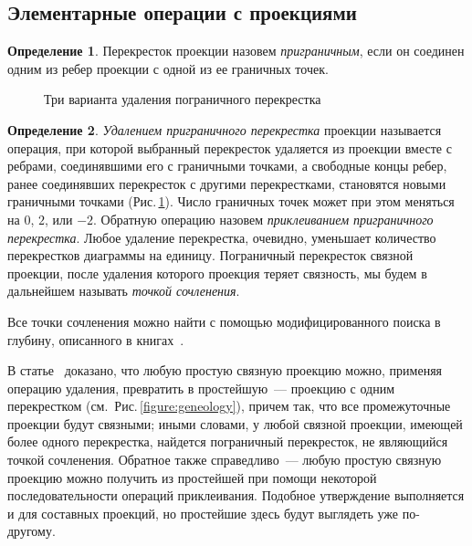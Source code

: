 \documentclass[12pt]{article}
\theoremstyle{plain}
\theoremstyle{definition}
\newtheorem{definition}{Определение}
\def\figureref#1{Рис.\,\protect\ref{#1}}
\begin{document}
	\subsection{Элементарные операции с проекциями}
	\label{subsection:cutting}

		\begin{definition}
			Перекресток проекции назовем \textit{приграничным}, если он соединен одним из ребер проекции с
			одной из ее граничных точек.
		\end{definition}

		\begin{figure}[ht]
			\centering
			\qquad
			\qquad
			\caption{\footnotesize Три варианта удаления пограничного перекрестка\label{figure:tangle-border-deletion}}
		\end{figure}

		\begin{definition}
			\textit{Удалением приграничного перекрестка} проекции называется операция, при которой выбранный
			перекресток удаляется из проекции вместе с ребрами, соединявшими его с граничными точками, а
			свободные концы ребер, ранее соединявших перекресток с другими перекрестками, становятся новыми
			граничными точками (\figureref{figure:tangle-border-deletion}). Число граничных точек может при этом меняться на
			$0$, $2$, или $-2$. Обратную операцию назовем \textit{приклеиванием приграничного перекрестка}. Любое удаление
			перекрестка, очевидно, уменьшает количество перекрестков диаграммы на единицу.
			Пограничный перекресток связной проекции, после удаления которого проекция теряет связность, мы будем в
			дальнейшем называть \textit{точкой сочленения}.
		\end{definition}

		Все точки сочленения можно найти с помощью модифицированного поиска в глубину, описанного в
		книгах~\cite{CormenLeisersonRivestStein2009, Sedgewick1983}.

		В статье~\cite{BogdanovMeshkovOmelchenkoPetrov2011} доказано, что любую простую связную проекцию можно, применяя
		операцию удаления, превратить в простейшую~--- проекцию с одним перекрестком (см.~\figureref{figure:geneology}), причем так,
		что все промежуточные проекции будут связными; иными словами, у любой связной проекции, имеющей более одного перекрестка, найдется
		пограничный перекресток, не являющийся точкой сочленения. Обратное также справедливо~--- любую простую связную проекцию можно получить
		из простейшей при помощи некоторой последовательности операций приклеивания. Подобное утверждение выполняется и для составных
		проекций, но простейшие здесь будут выглядеть уже по-другому.
\end{document}
